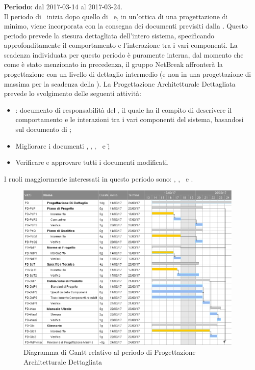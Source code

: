 	
		\subsubsection{\PD}
		\textbf{Periodo}: dal 2017-03-14 al 2017-03-24.\\
		Il periodo di \PD\ inizia dopo quello di \PA\ e, in un'ottica di una progettazione di minimo, viene incorporata con la consegna dei documenti previsiti dalla \RQ. Questo periodo prevede la stesura dettagliata dell’intero sistema, specificando approfonditamente il comportamento e l’interazione tra i vari componenti. La scadenza individuata per questo periodo è puramente interna, dal momento che come è stato menzionato in precedenza, il gruppo NetBreak affronterà la progettazione con un livello di dettaglio intermedio (e non in una progettazione di massima per la scadenza della \RP).
		La Progettazione Architetturale Dettagliata prevede lo svolgimento delle seguenti attività:
		\begin{itemize}
			\item \textit{\DDP}: documento di responsabilità del \textit{\Prog}, il quale ha il compito di descrivere il comportamento	e le interazioni tra i vari componenti del sistema, basandosi sul documento di \ST;
			\item  Migliorare i documenti \NdP, \PdP, \PdQ, \ST\ e \G;
			\item Verificare e approvare tutti i documenti modificati.
		\end{itemize}
		I ruoli maggiormente interessati in questo periodo sono: \textit{\Amm}, \textit{\Res}, \textit{\Prog}\ e \textit{\Ver}.
		
		\begin{figure}[H]
			\centering
			\includegraphics[scale=0.43]{img/ganttnetbreak4.png}
			\caption{Diagramma di Gantt relativo al periodo di Progettazione Architetturale Dettagliata}
		\end{figure}
		
